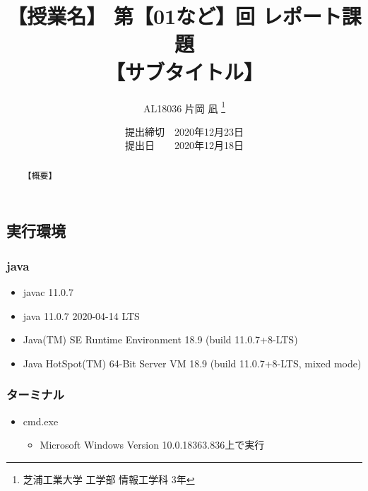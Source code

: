 \documentclass[a4paper, papersize]{jsarticle}
\title{
\vspace{-2cm} %
【授業名】 第【01など】回 レポート課題 \\
【サブタイトル】}
\author{AL18036 片岡 凪 \thanks{芝浦工業大学 工学部 情報工学科 3年}}
\date{提出締切　2020年12月23日 \\
提出日　　2020年12月18日}
\begin{document}
\maketitle


\setcounter{tocdepth}{2}
\tableofcontents
\newpage


\begin{abstract}
  【概要】
\end{abstract}


\begin{multicols}{2}
  \setcounter{section}{-1}


  \section{実行環境}
  \subsubsection{java}
  \begin{itemize}
    \item javac 11.0.7
    \item java 11.0.7 2020-04-14 LTS
    \item Java(TM) SE Runtime Environment 18.9 (build 11.0.7+8-LTS)
    \item Java HotSpot(TM) 64-Bit Server VM 18.9 (build 11.0.7+8-LTS, mixed mode)
  \end{itemize}


  \subsubsection{ターミナル}
  \begin{itemize}
    \item cmd.exe
          \begin{itemize}
            \item Microsoft Windows Version 10.0.18363.836上で実行
          \end{itemize}
  \end{itemize}


\end{multicols}
\end{document}
